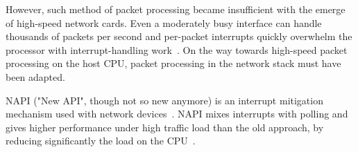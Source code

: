 However, such method of packet processing became insufficient with the emerge of high-speed network cards.
Even a moderately busy interface can handle thousands of packets per second
and per-packet interrupts quickly overwhelm the processor with interrupt-handling work~\cite{low-latency-ethernet-device-polling}.
On the way towards high-speed packet processing on the host CPU,
packet processing in the network stack must have been adapted.

NAPI ("New API", though not so new anymore)
is an interrupt mitigation mechanism used with network devices~\cite{reworking-napi}.
NAPI mixes interrupts with polling and gives higher performance under high traffic load
than the old approach, by reducing significantly the load on the CPU~\cite{understanding-internals}.



















